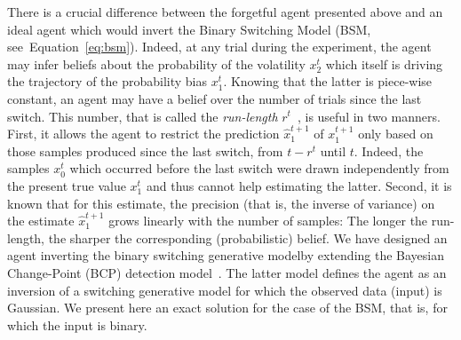 \documentclass[10pt,letterpaper]{article}
\newcommand{\citep}[1]{\cite{#1}}
\newcommand{\seeEq}[1]{Equation~\ref{eq:#1}}
\newcommand{\AM}[1]{\textbf{\textcolor{blue}{[AM: #1]}}}
\begin{document}
There is a crucial difference between the forgetful agent presented above
and an ideal agent which would invert the Binary Switching Model (BSM, see~\seeEq{bsm}).
Indeed, at any trial during the experiment,
the agent may infer beliefs about the probability of the volatility $x_2^t$
which itself is driving the trajectory of the probability bias $x_1^t$.
Knowing that the latter is piece-wise constant,
an agent may have a belief over the number of trials since the last switch.
This number, that is called the \emph{run-length} $r^t$~\citep{AdamsMackay2007}, is useful in two manners.
First, it allows the agent to restrict the prediction $\hat{x}_1^{t+1}$ of $x_1^{t+1}$
only based on those samples produced since the last switch, from $t-r^t$ until $t$.
Indeed, the samples $x_0^t$ which occurred before the last switch
were drawn independently from the present true value $x_1^t$
and thus cannot help estimating the latter.
Second, it is known that for this estimate, the precision
(that is, the inverse of variance) on the estimate $\hat{x}_1^{t+1}$
grows linearly with the number of samples:
The longer the run-length, the sharper the corresponding (probabilistic) belief.
We have designed an agent inverting the binary switching generative modelby extending
the Bayesian Change-Point (BCP) detection model~\citep{AdamsMackay2007}.
The latter model defines the agent as an inversion of a switching generative model
for which the observed data (input) is Gaussian.
We present here an exact solution for the case of the BSM,
that is, for which the input is binary. %
\end{document}
